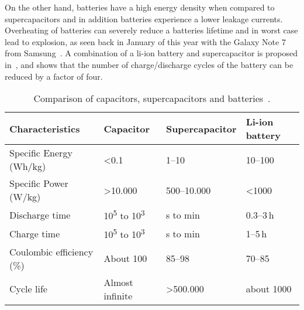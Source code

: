 On the other hand, batteries have a high energy density when compared to supercapacitors and in addition batteries experience a lower leakage currents.
Overheating of batteries can severely reduce a batteries lifetime and in worst case lead to explosion, as seen back in January of this year with the Galaxy Note 7 from Samsung~\cite{samsung_note7_2017}.
A combination of a li-ion battery and supercapacitor is proposed in~\cite{ongaro_pwre_2012}, and shows that the number of charge/discharge cycles of the battery can be reduced by a factor of four.


\begin{table}[t]
	\centering
	\begin{threeparttable}
		\caption{Comparison of capacitors, supercapacitors and batteries~\cite{Gonzalez_rser_2016}.}
		\label{tab:cap_scap_battery}
		\small
		\begin{tabular}{|l||l|l|l|}
			\hline
			Characteristics & Capacitor & Supercapacitor & Li-ion battery \\
			\hline \hline
			Specific Energy (Wh/kg) & \textless 0.1 & 1--10 & 10--100 \\
			Specific Power (W/kg) & \textgreater 10.000 & 500--10.000 & \textless 1000 \\
			Discharge time & 10\textsuperscript{5} to 10\textsuperscript{3} & s to min & 0.3--3\,h \\
			Charge time & 10\textsuperscript{5} to 10\textsuperscript{3} & s to min & 1--5\,h \\
			Coulombic efficiency (\%) & About 100 & 85--98 & 70--85 \\
			Cycle life & Almost infinite & \textgreater 500.000 & about 1000 \\
			\hline
		\end{tabular}
	\end{threeparttable}
\end{table}


